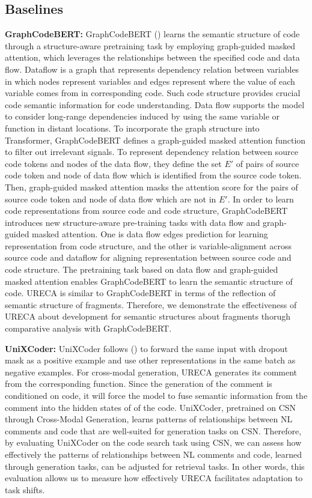 \subsection{Baselines}
\textbf{GraphCodeBERT: }
GraphCodeBERT (\cite{GuoRLFT0ZDSFTDC21}) learns the semantic structure of code through a structure-aware pretraining task 
by employing graph-guided masked attention, which leverages the relationships 
between the specified code and data flow.
Dataflow is a graph that represents dependency relation between variables 
in which nodes represent variables and edges represent where the value of each variable comes from
in corresponding code.
Such code structure provides crucial code semantic information for code understanding.
Data flow supports the model to consider long-range dependencies induced by using the same variable or 
function in distant locations.
To incorporate the graph structure into Transformer, 
GraphCodeBERT defines a graph-guided masked attention function to filter out irrelevant signals. 
To represent dependency relation between source code tokens and nodes of the data flow, 
they define the set $E'$ of pairs of source code token and node of data flow which is identified 
from the source code token.
Then, graph-guided masked attention masks the attention score for the pairs of source code token and 
node of data flow which are not in $E'$. 
In order to learn code representations from source code and code structure, 
GraphCodeBERT introduces new structure-aware pre-training tasks with data flow and graph-guided masked attention.
One is data flow edges prediction for learning representation from code structure, 
and the other is variable-alignment across source code and dataflow for aligning representation 
between source code and code structure.
The pretraining task based on data flow and graph-guided masked attention enables GraphCodeBERT 
to learn the semantic structure of code.
URECA is similar to GraphCodeBERT in terms of the reflection of semantic structure of fragments.
Therefore, we demonstrate the effectiveness of URECA about development for semantic structures 
about fragments thorugh comparative analysis with GraphCodeBERT.

\textbf{UniXCoder: }
UniXCoder follows (\cite{GuoLDW0022}) to forward the same input with dropout mask as a positive example 
and use other representations in the same batch as negative examples.
For cross-modal generation, URECA generates its comment from the corresponding function.
Since the generation of the comment is conditioned on code, it will force the model 
to fuse semantic information from the comment into the hidden states of of the code.
UniXCoder, pretrained on CSN through Cross-Modal Generation, learns patterns of relationships 
between NL comments and code that are well-suited for generation tasks on CSN.
Therefore, by evaluating UniXCoder on the code search task using CSN, 
we can assess how effectively the patterns of relationships between NL comments and code, 
learned through generation tasks, can be adjusted for retrieval tasks. 
In other words, this evaluation allows us to measure how effectively URECA facilitates adaptation to task shifts.

